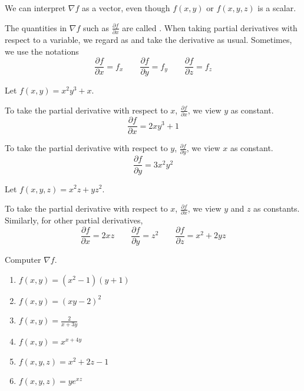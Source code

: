 \documentclass[11pt,fleqn]{book} %
\begin{document}
We can interpret $\nabla f$ as a vector, even though $f(x, y)$ or $f(x, y, z)$ is a scalar.

The quantities in $\nabla f$ such as $\frac{\partial f}{\partial x}$ are called . When taking partial derivatives with respect to a variable, we regard  as  and take the derivative as usual. Sometimes, we use the notations $$\frac{\partial f}{\partial x} = f_x \qquad \frac{\partial f}{\partial y} = f_y \qquad \frac{\partial f}{\partial z} = f_z$$

\begin{example}
    Let $f(x, y) = x^2 y^3 + x$. 

    To take the partial derivative with respect to $x$, $\frac{\partial f}{\partial x}$, we view $y$ as constant. 
    $$\frac{\partial f}{\partial x} = 2xy^3 + 1$$

    To take the partial derivative with respect to $y$, $\frac{\partial f}{\partial y}$, we view $x$ as constant. 
    $$\frac{\partial f}{\partial y} = 3x^2y^2$$
\end{example}

\begin{example}
    Let $f(x, y, z) = x^2z + yz^2$. 

    To take the partial derivative with respect to $x$, $\frac{\partial f}{\partial x}$, we view  $y$ and $z$ as constants. Similarly, for other partial derivatives, 
    $$\frac{\partial f}{\partial x} = 2xz \qquad \frac{\partial f}{\partial y} = z^2 \qquad \frac{\partial f}{\partial z} = x^2 + 2yz$$
\end{example}

\begin{exercise}
    Computer $\nabla f$. 

    \begin{minipage}[t]{0.45\linewidth} 
        \begin{enumerate}
            \item $f(x, y) = (x^2 - 1)(y + 1)$
            \item $f(x, y) = (xy - 2)^2$
            \item $f(x, y) = \frac{2}{x + 3y}$
        \end{enumerate}
    \end{minipage}   
    \begin{minipage}[t]{0.45\linewidth} 
        \begin{enumerate}
            \setcounter{enumi}{3}
            \item $f(x, y) = x^{x + 4y}$
            \item $f(x, y, z) = x^2 + 2z - 1$
            \item $f(x, y, z) = ye^{xz}$
        \end{enumerate}
    \end{minipage}   
\end{exercise}
\end{document}
